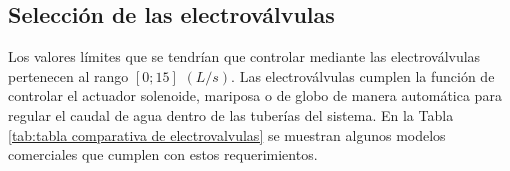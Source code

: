\subsection{Selección de las electroválvulas}

Los valores límites que se tendrían que controlar mediante las electroválvulas pertenecen al rango $[0;15]$ $(L/s)$. Las electroválvulas cumplen la función de controlar el actuador solenoide, mariposa o de globo de manera automática para regular el caudal de agua dentro de las tuberías del sistema. En la Tabla \ref{tab:tabla comparativa de electrovalvulas} se muestran algunos modelos comerciales que cumplen con estos requerimientos.

